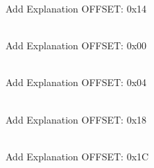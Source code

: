 \begin{DoxyRefList}
Add Explanation OFFSET\+: 0x14  
\item[{\parbox[t]{\linewidth}{Member \doxylink{struct_s_y_s_c_f_g___reg_def__t_a1088a147730054a910827504ed395a74}{SYSCFG\+\_\+\+Reg\+Def\+\_\+t\+::MEMRMP} }}]\hfill \\
\label{todo__todo000055}%
%
Add Explanation OFFSET\+: 0x00  
\item[{\parbox[t]{\linewidth}{Member \doxylink{struct_s_y_s_c_f_g___reg_def__t_a7338e0dd26ad4e7c445fb787145353f8}{SYSCFG\+\_\+\+Reg\+Def\+\_\+t\+::PMC} }}]\hfill \\
\label{todo__todo000056}%
%
Add Explanation OFFSET\+: 0x04  
\item[{\parbox[t]{\linewidth}{Member \doxylink{struct_s_y_s_c_f_g___reg_def__t_a7c69d7b9ee99f97a1b7666d61c365e4c}{SYSCFG\+\_\+\+Reg\+Def\+\_\+t\+::reserved1} }}]\hfill \\
\label{todo__todo000061}%
%
Add Explanation OFFSET\+: 0x18  
\item[{\parbox[t]{\linewidth}{Member \doxylink{struct_s_y_s_c_f_g___reg_def__t_aae840ce1fd313e94b68edf49b9bd0132}{SYSCFG\+\_\+\+Reg\+Def\+\_\+t\+::reserved2} }}]\hfill \\
\label{todo__todo000062}%
%
Add Explanation OFFSET\+: 0x1C 
\end{DoxyRefList}